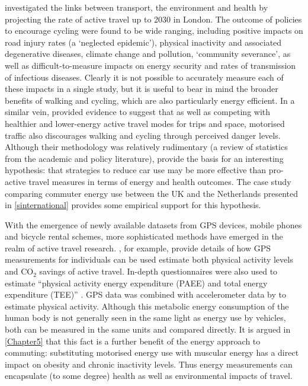 \documentclass[a4paper, 11pt, twoside]{Thesis}
\begin{document}
\citet{Woodcock2007} investigated the links between transport, the environment
and health by projecting the rate of active travel up to 2030 in London.
The outcome of policies to encourage cycling were found to be wide ranging,
including positive impacts on road injury rates (a `neglected epidemic'), physical
inactivity and associated degenerative diseases, climate change and pollution,
`community severance', as well as difficult-to-measure impacts on energy
security and rates of transmission of infectious diseases. Clearly it is not
possible to accurately measure each of these impacts in a single study, but
it is useful to bear in mind the broader benefits of walking and cycling, which
are also particularly energy efficient. In a similar vein, \citet{Jacobsen2009}
provided evidence to suggest that as well as competing with healthier
and lower-energy active travel modes
for trips and space, motorised traffic also discourages walking and cycling
through perceived danger levels. Although their methodology was relatively
rudimentary (a review of statistics from the academic and policy literature),
\citet{Jacobsen2009} provide the basis for an interesting hypothesis:
that strategies to reduce
car use may be more effective than pro-active travel measures in terms of energy
and health outcomes. The case study comparing commuter energy use between
the UK and the Netherlands presented in \cref{sinternational} provides some
empirical support for this hypothesis.

With the emergence of newly available datasets from GPS devices, mobile phones
and bicycle rental schemes, more sophisticated methods have emerged in
the realm of active travel research. \citet{Ogil-cambridge2010}, for example,
provide details of how GPS measurements for individuals can be used
estimate both physical activity levels and CO$_2$ savings of active travel.
In-depth questionnaires were also used to estimate
``physical activity energy expenditure (PAEE) and total energy expenditure (TEE)''
\citep[p.~7]{Ogil-cambridge2010}. GPS data was combined with
accelerometer data by \citet{Cooper2010} to estimate physical activity. Although this
metabolic energy consumption of the human body is not
generally seen in the same light as energy use by vehicles, both can be measured
in the same units and compared directly. It is argued in \cref{Chapter5} that
this fact is a further benefit of the energy approach to commuting: substituting
motorised energy use with muscular energy has a direct impact on obesity and
chronic inactivity levels. Thus energy measurements can
encapsulate (to some degree) health as well as environmental impacts of travel.
\end{document}
